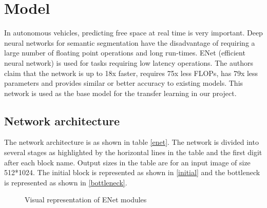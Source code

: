 \documentclass[a4paper, 12pt, oneside, BCOR1cm,toc=chapterentrywithdots]{scrbook}
\begin{document}
\newpage

\section{Model}

In autonomous vehicles, predicting free space at real time is very important. Deep neural networks for semantic segmentation have the disadvantage of requiring a large number of floating point operations and long run-times. ENet (efficient neural network) \cite{Paszke2017ENetAD} is used for tasks requiring low latency operations. The authors claim that the network is up to 18x faster, requires 75x less FLOPs, has 79x less parameters and provides similar or better accuracy to existing models\cite{Paszke2017ENetAD}. This network is used as the base model for the transfer learning in our project.




\subsection{Network architecture}

The network architecture is as shown in table \ref{enet}. The network is divided into several stages as highlighted by the horizontal lines in the table and the first digit after each block name. Output sizes in the table are for an input image of size 512*1024. The initial block is represented as shown in \ref{initial} and the bottleneck is represented as shown in \ref{bottleneck}.  

\begin{figure}[h]
\caption{Visual representation of ENet modules  \cite{Paszke2017ENetAD}}
\end{figure}
\end{document}
